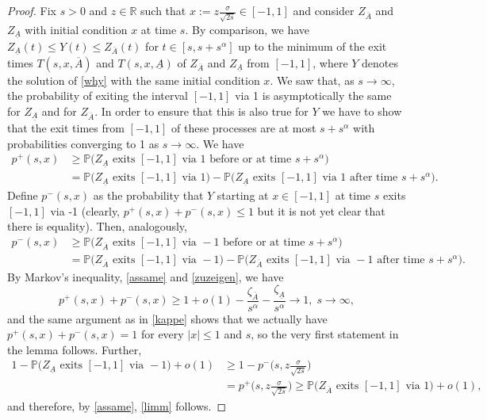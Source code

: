 \documentclass[sn-mathphys-num]{sn-jnl}
\theoremstyle{definition}
\numberwithin{equation}{section} \theoremstyle{remark}
\def\R{\mathbb R}
\def\P{\mathbb P}
\newcommand{\1}{\mathbbm{1}}
\renewcommand{\bar}{\overline}
\begin{document}
\begin{proof}
Fix $s >0$ and $z \in \R$ such that $x:=z\frac{\sigma}{\sqrt{2s}}\in[-1,1]$ and consider  $Z_{\bar A}$ and $Z_{\underline A}$ with initial condition $x$ at time $s$.
By comparison, we have $Z_{\underline A}(t)\leq Y(t) \leq Z_{\overline A}(t)$ for $t \in [s,s+s^\alpha]$ up to the minimum of the exit times $T(s,x,\bar A)$ and  $T(s,x,\underline A)$ of
$Z_{\overline A}$ and $Z_{\underline A}$ from $[-1,1]$, where $Y$ denotes the solution of \eqref{why} with the same initial condition $x$.  We saw that, as $s \to \infty$, the probability of exiting the
interval $[-1,1]$ via 1 is asymptotically the same for   $Z_{\underline A}$ and for $Z_{\bar A}$. In order to ensure that this is also true for $Y$ we have to show that the exit times from $[-1,1]$
of these processes are at most $s+s^{\alpha}$ with probabilities converging to 1 as $s \to \infty$. We have
\begin{align*}
  p^+(s,x)&\geq \P\big(Z_{\underline{A}}\mbox{ exits }[-1,1] \mbox{ via } 1 \mbox{ before or at time } s+s^{\alpha}\big)\\
  &=\P\big( Z_{\underline{A}}\mbox{ exits }[-1,1] \mbox{ via } 1\big)-  \P\big(Z_{\underline{A}}\mbox{ exits }[-1,1] \mbox{ via } 1 \mbox{ after time }s+s^{\alpha}\big).
\end{align*}
Define $p^-(s,x)$ as the probability that $Y$ starting at $x\in [-1,1]$ at time $s$ exits $[-1,1]$ via -1 (clearly, $p^+(s,x)+p^-(s,x)\leq 1$ but it is not yet clear that there is equality). Then, analogously,
\begin{align*}
  p^-(s,x)&\geq \P\big(Z_{\bar{A}}\mbox{ exits }[-1,1] \mbox{ via } -1 \mbox{ before or at time } s+s^{\alpha}\big)\\
  &=\P\big( Z_{\bar{A}}\mbox{ exits }[-1,1] \mbox{ via } -1\big)-  \P\big(Z_{\bar{A}}\mbox{ exits }[-1,1] \mbox{ via } -1 \mbox{ after time }s+s^{\alpha}\big).
\end{align*}  
By Markov's inequality, \eqref{assame} and \eqref{zuzeigen}, we have
$$
 p^+(s,x)+ p^-(s,x)\geq 1+o(1)-\frac{\zeta_{\bar A}}{s^{\alpha}}- \frac{\zeta_{\underline A}}{s^{\alpha}}\to 1,\;s \to \infty,
 $$
 and the same argument as in \eqref{kappe} shows that we actually have $ p^+(s,x)+ p^-(s,x)=1$ for every $|x|\leq 1$ and $s$, so the very first statement in the lemma follows. Further,
 \begin{align*}
   1-\P\big( Z_{\underline{A}}\mbox{ exits }[-1,1] \mbox{ via } -1\big)+o(1)&\geq 1-p^-\big(s,z\frac {\sigma}{\sqrt{2s}}\big)\\
   &=p^+\big(s,z\frac {\sigma}{\sqrt{2s}}\big)\geq \P\big( Z_{\bar{A}}\mbox{ exits }[-1,1] \mbox{ via } 1\big)+o(1),
\end{align*}
and therefore, by \eqref{assame}, \eqref{limm} follows.




\end{proof}
\end{document}
